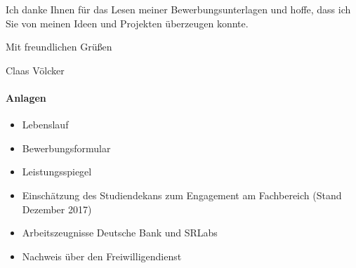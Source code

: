 Ich danke Ihnen für das Lesen meiner Bewerbungsunterlagen und hoffe, dass ich Sie von meinen Ideen und Projekten überzeugen konnte.

Mit freundlichen Grüßen

Claas Völcker

\vspace{1cm}

\paragraph{Anlagen}
\begin{itemize}
    \item Lebenslauf
    \item Bewerbungsformular
    \item Leistungsspiegel
    \item Einschätzung des Studiendekans zum Engagement am Fachbereich (Stand Dezember 2017)
    \item Arbeitszeugnisse Deutsche Bank und SRLabs
    \item Nachweis über den Freiwilligendienst
\end{itemize}
